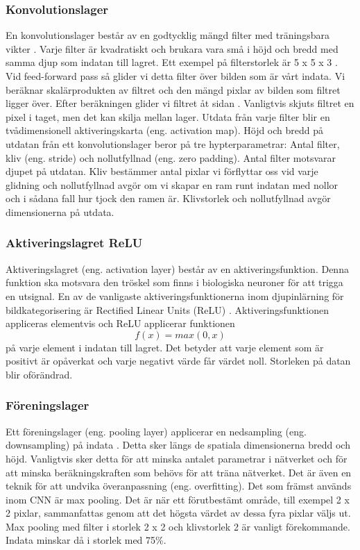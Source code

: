 \documentclass[]{kththesis}
\begin{document}
\subsubsection{Konvolutionslager}
En konvolutionslager består av en godtycklig mängd filter med träningsbara vikter \parencite{lecun1995convolutional}. Varje filter är kvadratiskt och brukara vara små i höjd och bredd med samma djup som indatan till lagret. Ett exempel på filterstorlek är 5 x 5 x 3 \parencite{krizhevsky2012imagenet}. Vid feed-forward pass så glider vi detta filter över bilden som är vårt indata. Vi beräknar skalärprodukten av filtret och den mängd pixlar av bilden som filtret ligger över. Efter beräkningen glider vi filtret åt sidan \parencite{he2015spatial}. Vanligtvis skjuts filtret en pixel i taget, men det kan skilja mellan lager. Utdata från varje filter blir en tvådimensionell aktiveringskarta (eng. activation map). Höjd och bredd på utdatan från ett konvolutionslager beror på tre hypterparametrar: Antal filter, kliv (eng. stride) och nollutfyllnad (eng. zero padding). Antal filter motsvarar djupet på utdatan. Kliv bestämmer antal pixlar vi förflyttar oss vid varje glidning och nollutfyllnad avgör om vi skapar en ram runt indatan med nollor och i sådana fall hur tjock den ramen är. Klivstorlek och nollutfyllnad avgör dimensionerna på utdata.

\subsubsection{Aktiveringslagret ReLU}
Aktiveringslagret (eng. activation layer) består av en aktiveringsfunktion. Denna funktion ska motsvara den tröskel som finns i biologiska neuroner för att trigga en utsignal. En av de vanligaste aktiveringsfunktionerna inom djupinlärning för bildkategorisering är Rectified Linear Units (ReLU) \parencite{krizhevsky2012imagenet}. Aktiveringsfunktionen appliceras elementvis och ReLU applicerar funktionen \begin{equation} f(x) = max(0,x) \end{equation} på varje element i indatan till lagret. Det betyder att varje element som är positivt är opåverkat och varje negativt värde får värdet noll. Storleken på datan blir oförändrad.

\subsubsection{Föreningslager}
Ett föreningslager (eng. pooling layer) applicerar en nedsampling (eng. downsampling) på indata \parencite{krizhevsky2012imagenet}. Detta sker längs de spatiala dimensionerna bredd och höjd. Vanligtvis sker detta för att minska antalet parametrar i nätverket och för att minska beräkningskraften som behövs för att träna nätverket. Det är även en teknik för att undvika överanpassning (eng. overfitting). Det som främst används inom CNN är max pooling. Det är när ett förutbestämt område, till exempel 2 x 2 pixlar, sammanfattas genom att det högsta värdet av dessa fyra pixlar väljs ut. Max pooling med filter i storlek 2 x 2 och klivstorlek 2 är vanligt förekommande. Indata minskar då i storlek med 75\%.
\end{document}
